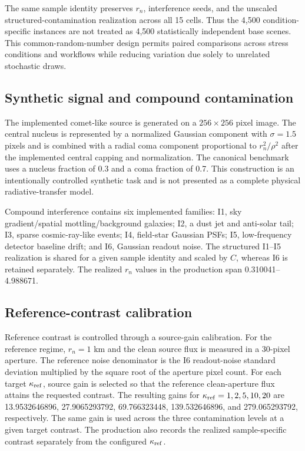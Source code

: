 The same sample identity preserves \(r_n\), interference seeds, and the
unscaled structured-contamination realization across all 15 cells. Thus
the 4,500 condition-specific instances are not treated as 4,500
statistically independent base scenes. This common-random-number design
permits paired comparisons across stress conditions and workflows while
reducing variation due solely to unrelated stochastic draws.

\subsection{Synthetic signal and compound
contamination}\label{synthetic-signal-and-compound-contamination}

The implemented comet-like source is generated on a \(256\times256\)
pixel image. The central nucleus is represented by a normalized Gaussian
component with \(\sigma=1.5\) pixels and is combined with a radial coma
component proportional to \(r_n^2/\rho^2\) after the implemented
central capping and normalization. The canonical benchmark uses a
nucleus fraction of 0.3 and a coma fraction of 0.7. This construction is
an intentionally controlled synthetic task and is not presented as a
complete physical radiative-transfer model.

Compound interference contains six implemented families: I1, sky
gradient/spatial mottling/background galaxies; I2, a dust jet and
anti-solar tail; I3, sparse cosmic-ray-like events; I4, field-star
Gaussian PSFs; I5, low-frequency detector baseline drift; and I6,
Gaussian readout noise. The structured I1--I5 realization is shared for
a given sample identity and scaled by \(C\), whereas I6 is retained
separately. The realized \(r_n\) values in the production span
0.310041--4.988671.

\subsection{Reference-contrast
calibration}\label{reference-contrast-calibration}

Reference contrast is controlled through a source-gain calibration. For
the reference regime, \(r_n=1\) km and the clean source flux is measured
in a 30-pixel aperture. The reference noise denominator is the I6
readout-noise standard deviation multiplied by the square root of the
aperture pixel count. For each target \(\kappa_{\rm ref}\), source
gain is selected so that the reference clean-aperture flux attains the
requested contrast. The resulting gains for
\(\kappa_{\rm ref}=1,2,5,10,20\) are 13.9532646896, 27.9065293792,
69.766323448, 139.532646896, and 279.065293792, respectively. The same
gain is used across the three contamination levels at a given target
contrast. The production also records the realized sample-specific
contrast separately from the configured \(\kappa_{\rm ref}\).

